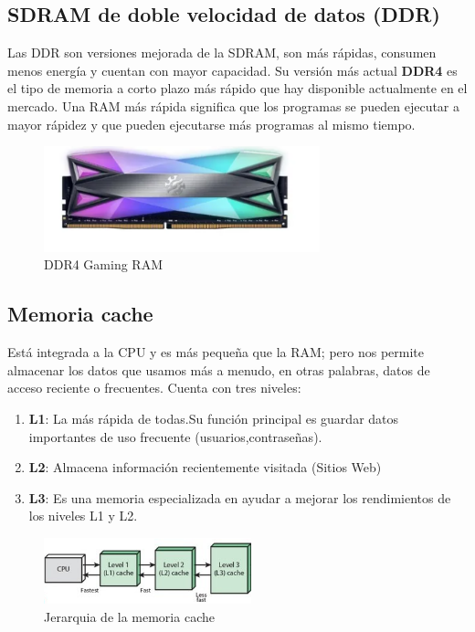 \documentclass{article}
\begin{document}
\subsection{SDRAM de doble velocidad de datos (DDR)}
Las DDR son versiones mejorada de la SDRAM, son más rápidas, consumen menos energía y cuentan con mayor capacidad. Su versión más actual \textbf{DDR4} es el tipo de memoria a corto plazo más rápido que hay disponible actualmente en el mercado. Una RAM más rápida significa que los programas se pueden ejecutar a mayor rápidez y que pueden ejecutarse más programas al mismo tiempo.
\vspace{0.2cm}
\begin{figure}[h]
\includegraphics[width=8cm]{DDR4.PNG}
\centering
\caption{DDR4 Gaming RAM}
\label{DDR4.PNG}
\end{figure}
\newpage
\subsection{Memoria cache}
Está integrada a la CPU y es más pequeña que la RAM; pero nos permite almacenar los datos que usamos más a menudo, en otras palabras, datos de acceso reciente o frecuentes. Cuenta con tres niveles:
\begin{enumerate}
\item \textbf{L1}: La más rápida de todas.Su función principal es guardar datos importantes de uso frecuente (usuarios,contraseñas).
\item \textbf{L2}: Almacena información recientemente visitada (Sitios Web)
\item \textbf{L3}: Es una memoria especializada en ayudar a mejorar los rendimientos de los niveles L1 y L2.
\end{enumerate}

\begin{figure}[h]
\includegraphics[width=6cm]{Cache.PNG}
\centering
\caption{Jerarquia de la memoria cache\cite{URUGUAYOC}}
\label{Cache.PNG}
\end{figure}
\end{document}
